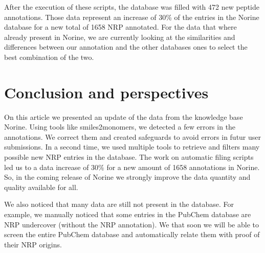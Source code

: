 \documentclass[long, final]{jobim2017}
\begin{document}
After the execution of these scripts, the database was filled with 472 new peptide annotations.
Those data represent an increase of 30\% of the entries in the Norine database for a new total of 1658 NRP annotated.
For the data that where already present in Norine, we are currently looking at the similarities and differences between our annotation and the other databases ones to select the best combination of the two.


\section{Conclusion and perspectives}

On this article we presented an update of the data from the knowledge base Norine.
Using tools like smiles2monomers, we detected a few errors in the annotations.
We correct them and created safeguards to avoid errors in futur user submissions.
In a second time, we used multiple tools to retrieve and filters many possible new NRP entries in the database.
The work on automatic filing scripts led us to a data increase of 30\% for a new amount of 1658 annotations in Norine.
So, in the coming release of Norine we strongly improve the data quantity and quality available for all.

We also noticed that many data are still not present in the database.
For example, we manually noticed that some entries in the PubChem database are NRP undercover (without the NRP annotation).
We that soon we will be able to screen the entire PubChem database and automatically relate them with proof of their NRP origins.



 
 
\end{document}
